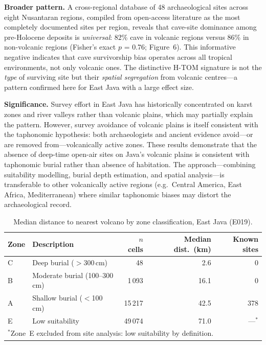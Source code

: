 \documentclass[12pt]{article}
\begin{document}
\textbf{Broader pattern.}
A cross-regional database of 48 archaeological sites across eight Nusantaran regions, compiled from open-access literature as the most completely documented sites per region, reveals that cave-site dominance among pre-Holocene deposits is \textit{universal}: 82\% cave in volcanic regions versus 86\% in non-volcanic regions (Fisher's exact $p$ = 0.76; Figure~6).
This informative negative indicates that cave survivorship bias operates across all tropical environments, not only volcanic ones.
The distinctive H-TOM signature is not the \textit{type} of surviving site but their \textit{spatial segregation} from volcanic centres---a pattern confirmed here for East Java with a large effect size.

\textbf{Significance.}
Survey effort in East Java has historically concentrated on karst zones and river valleys rather than volcanic plains, which may partially explain the pattern.
However, survey avoidance of volcanic plains is itself consistent with the taphonomic hypothesis: both archaeologists and ancient evidence avoid---or are removed from---volcanically active zones.
These results demonstrate that the absence of deep-time open-air sites on Java's volcanic plains is consistent with taphonomic burial rather than absence of habitation.
The approach---combining suitability modelling, burial depth estimation, and spatial analysis---is transferable to other volcanically active regions (e.g.\ Central America, East Africa, Mediterranean) where similar taphonomic biases may distort the archaeological record.

\begin{table}[h]
\centering
\small
\caption{Median distance to nearest volcano by zone classification, East Java (E019).}
\label{tab:zones}
\begin{tabular}{llrrr}
\hline
Zone & Description & $n$ cells & Median dist.\ (km) & Known sites \\
\hline
C & Deep burial ($>$300\,cm) & 48 & 2.6 & 0 \\
B & Moderate burial (100--300\,cm) & 1\,093 & 16.1 & 0 \\
A & Shallow burial ($<$100\,cm) & 15\,217 & 42.5 & 378 \\
E & Low suitability & 49\,074 & 71.0 & ---$^*$ \\
\hline
\multicolumn{5}{l}{\footnotesize $^*$Zone~E excluded from site analysis: low suitability by definition.}
\end{tabular}
\end{table}
\end{document}
